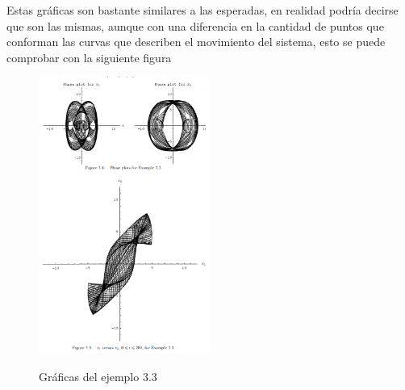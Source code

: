 \documentclass{article}
\begin{document}
Estas gráficas son bastante similares a las esperadas, en realidad podría decirse que son las mismas, aunque con una diferencia en la cantidad de puntos que conforman las curvas que describen el movimiento del sistema, esto se puede comprobar con la siguiente figura
\begin{figure}[H]
    \caption{Gráficas del ejemplo 3.3}
    \includegraphics[width=0.5\textwidth]{Ejemplo7.PNG}
    \centering
    \label{Cod}
\end{figure}
\end{document}
